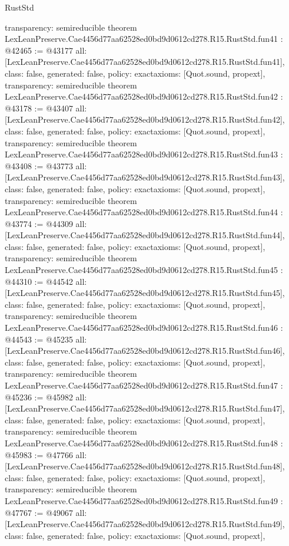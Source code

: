 \begin{lexlean}{RustStd}
\begin{coremodule}
{  transparency: semireducible
}
theorem LexLeanPreserve.Cae4456d77aa62528ed0bd9d0612cd278.R15.RustStd.fun41 : @42465 := @43177 {
  all: [LexLeanPreserve.Cae4456d77aa62528ed0bd9d0612cd278.R15.RustStd.fun41],
  class: false,
  generated: false,
  policy: exact{axioms: [Quot.sound, propext]},
  transparency: semireducible
}
theorem LexLeanPreserve.Cae4456d77aa62528ed0bd9d0612cd278.R15.RustStd.fun42 : @43178 := @43407 {
  all: [LexLeanPreserve.Cae4456d77aa62528ed0bd9d0612cd278.R15.RustStd.fun42],
  class: false,
  generated: false,
  policy: exact{axioms: [Quot.sound, propext]},
  transparency: semireducible
}
theorem LexLeanPreserve.Cae4456d77aa62528ed0bd9d0612cd278.R15.RustStd.fun43 : @43408 := @43773 {
  all: [LexLeanPreserve.Cae4456d77aa62528ed0bd9d0612cd278.R15.RustStd.fun43],
  class: false,
  generated: false,
  policy: exact{axioms: [Quot.sound, propext]},
  transparency: semireducible
}
theorem LexLeanPreserve.Cae4456d77aa62528ed0bd9d0612cd278.R15.RustStd.fun44 : @43774 := @44309 {
  all: [LexLeanPreserve.Cae4456d77aa62528ed0bd9d0612cd278.R15.RustStd.fun44],
  class: false,
  generated: false,
  policy: exact{axioms: [Quot.sound, propext]},
  transparency: semireducible
}
theorem LexLeanPreserve.Cae4456d77aa62528ed0bd9d0612cd278.R15.RustStd.fun45 : @44310 := @44542 {
  all: [LexLeanPreserve.Cae4456d77aa62528ed0bd9d0612cd278.R15.RustStd.fun45],
  class: false,
  generated: false,
  policy: exact{axioms: [Quot.sound, propext]},
  transparency: semireducible
}
theorem LexLeanPreserve.Cae4456d77aa62528ed0bd9d0612cd278.R15.RustStd.fun46 : @44543 := @45235 {
  all: [LexLeanPreserve.Cae4456d77aa62528ed0bd9d0612cd278.R15.RustStd.fun46],
  class: false,
  generated: false,
  policy: exact{axioms: [Quot.sound, propext]},
  transparency: semireducible
}
theorem LexLeanPreserve.Cae4456d77aa62528ed0bd9d0612cd278.R15.RustStd.fun47 : @45236 := @45982 {
  all: [LexLeanPreserve.Cae4456d77aa62528ed0bd9d0612cd278.R15.RustStd.fun47],
  class: false,
  generated: false,
  policy: exact{axioms: [Quot.sound, propext]},
  transparency: semireducible
}
theorem LexLeanPreserve.Cae4456d77aa62528ed0bd9d0612cd278.R15.RustStd.fun48 : @45983 := @47766 {
  all: [LexLeanPreserve.Cae4456d77aa62528ed0bd9d0612cd278.R15.RustStd.fun48],
  class: false,
  generated: false,
  policy: exact{axioms: [Quot.sound, propext]},
  transparency: semireducible
}
theorem LexLeanPreserve.Cae4456d77aa62528ed0bd9d0612cd278.R15.RustStd.fun49 : @47767 := @49067 {
  all: [LexLeanPreserve.Cae4456d77aa62528ed0bd9d0612cd278.R15.RustStd.fun49],
  class: false,
  generated: false,
  policy: exact{axioms: [Quot.sound, propext]},
}
\end{coremodule}
\end{lexlean}
